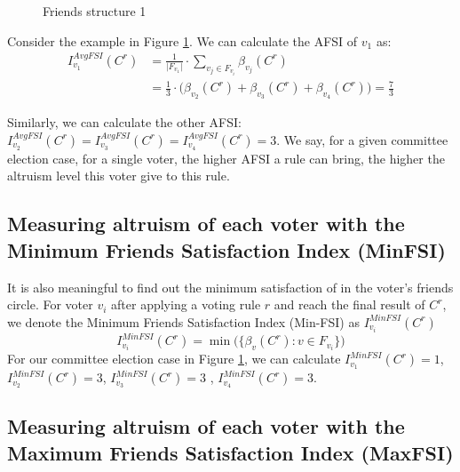 \documentclass{article}
\begin{document}
\begin{figure}[h]
\centering
{}
\caption{Friends structure 1} \label{fig:Figure1}
\end{figure} 

Consider the example in Figure  \ref{fig:Figure1}.  We can calculate the AFSI of  $v_1$ as:
\begin{equation*}
    \begin{split}
     I_{v_1}^{AvgFSI}(C^{r}) &= \frac{1}{\vert F_{v_1} \vert}\cdot \sum_{v_j\in {F_{v_i}}}  \beta_{v_j}(C^{r})\\
                 &= \frac{1}{3}\cdot \big(  \beta_{v_2}(C^{r}) +  \beta_{v_3}(C^{r}) +  \beta_{v_4}(C^{r}) \big) =\frac{7}{3}
\end{split}
\end{equation*}

Similarly, we can calculate the other AFSI: $ I_{v_2}^{AvgFSI}(C^{r}) = I_{v_3}^{AvgFSI}(C^{r})=I_{v_4}^{AvgFSI}(C^{r}) = 3$.
We say, for a given committee election case, for a single voter, the higher AFSI a rule can bring, the higher the altruism level this voter give to this rule. 

\subsection{Measuring altruism of each voter with the Minimum Friends Satisfaction Index (MinFSI)}
It is also meaningful to find out the minimum satisfaction of in the voter's friends circle. For voter $v_i$ after applying a voting rule $r$ and reach the final result of $C^{r}$, we denote the Minimum Friends Satisfaction Index (Min-FSI) as $I_{v_i}^{MinFSI}(C^{r})$
\begin{equation}I_{v_i}^{MinFSI}(C^{r}) =  \min \big ( \{ \beta_{v}(C^{r}): v \in F_{v_i}\}  \big)\label{si:MinFSI}
\end{equation}
For our committee election case in Figure   \ref{fig:Figure1}, we can calculate $I_{v_1}^{MinFSI}(C^{r}) = 1$, $I_{v_2}^{MinFSI}(C^{r}) =3$, $I_{v_3}^{MinFSI}(C^{r}) = 3$ , $I_{v_4}^{MinFSI}(C^{r}) =3$.


\subsection{Measuring altruism of each voter with the Maximum Friends Satisfaction Index (MaxFSI)}
\end{document}
